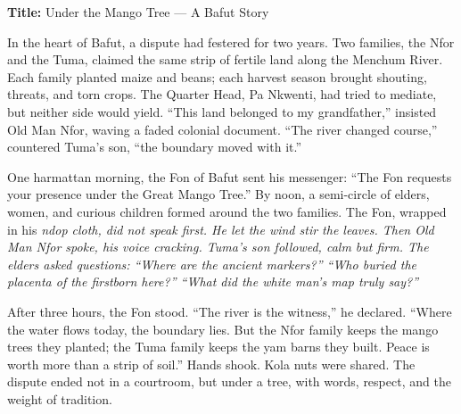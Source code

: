 \documentclass[11pt]{article}
\newcommand{\eng}[1]{\ifmmode\text{\textit{#1}}\else\begingroup\selectlanguage{english}\itshape #1\endgroup\fi}
\begin{document}
\begin{textebox}
\textbf{Title:} Under the Mango Tree — A Bafut Story
\par\medskip
In the heart of Bafut, a dispute had festered for two years. Two families, the Nfor and the Tuma, claimed the same strip of fertile land along the Menchum River. Each family planted maize and beans; each harvest season brought shouting, threats, and torn crops. The Quarter Head, Pa Nkwenti, had tried to mediate, but neither side would yield. “This land belonged to my grandfather,” insisted Old Man Nfor, waving a faded colonial document. “The river changed course,” countered Tuma’s son, “the boundary moved with it.”
\par\medskip
One harmattan morning, the Fon of Bafut sent his messenger: “The Fon requests your presence under the Great Mango Tree.” By noon, a semi-circle of elders, women, and curious children formed around the two families. The Fon, wrapped in his \eng{ndop} cloth, did not speak first. He let the wind stir the leaves. Then Old Man Nfor spoke, his voice cracking. Tuma’s son followed, calm but firm. The elders asked questions: “Where are the ancient markers?” “Who buried the placenta of the firstborn here?” “What did the white man’s map truly say?”
\par\medskip
After three hours, the Fon stood. “The river is the witness,” he declared. “Where the water flows today, the boundary lies. But the Nfor family keeps the mango trees they planted; the Tuma family keeps the yam barns they built. Peace is worth more than a strip of soil.” Hands shook. Kola nuts were shared. The dispute ended not in a courtroom, but under a tree, with words, respect, and the weight of tradition.
\end{textebox}
\end{document}
